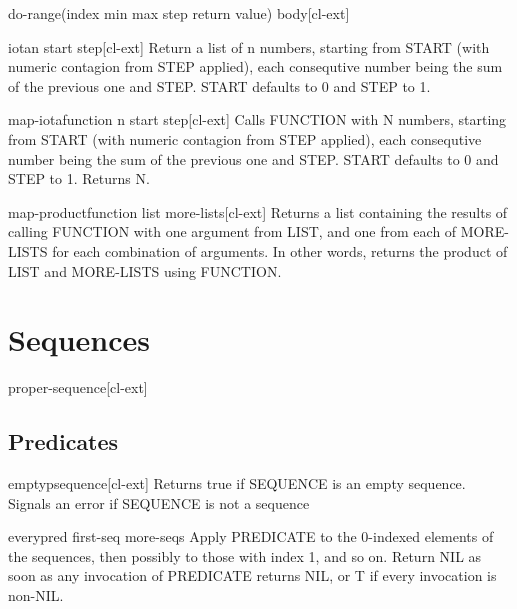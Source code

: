 \documentclass[10pt,english]{book}
\begin{document}
\begin{macro}{do-range}{(index \op min max step return value) \body body}[cl-ext]
  
\end{macro}

\begin{function}{iota}{n \key start step}[cl-ext]
  Return a list of n numbers, starting from START (with numeric
  contagion from STEP applied), each consequtive number being the sum
  of the previous one and STEP. START defaults to 0 and STEP to 1.
\end{function}

\begin{function}{map-iota}{function n \key start step}[cl-ext]
  Calls FUNCTION with N numbers, starting from START (with numeric contagion
from STEP applied), each consequtive number being the sum of the previous one
and STEP. START defaults to 0 and STEP to 1. Returns N.
\end{function}

\begin{function}{map-product}{function list \rest more-lists}[cl-ext]
  Returns a list containing the results of calling FUNCTION with one argument
from LIST, and one from each of MORE-LISTS for each combination of arguments.
In other words, returns the product of LIST and MORE-LISTS using FUNCTION.
\end{function}

\chapter{Sequences}
\label{cha:sequences}

\begin{type}{proper-sequence}{}[cl-ext]
  
\end{type}

\section{Predicates}
\label{sec:sequence-predicates}

\begin{function}{emptyp}{sequence}[cl-ext]
  Returns true if SEQUENCE is an empty sequence. Signals an error if
  SEQUENCE is not a sequence
\end{function}

\begin{function}{every}{pred first-seq \rest more-seqs}
  Apply PREDICATE to the 0-indexed elements of the sequences, then
  possibly to those with index 1, and so on. Return NIL as soon
  as any invocation of PREDICATE returns NIL, or T if every invocation
  is non-NIL.
\end{function}
\end{document}
